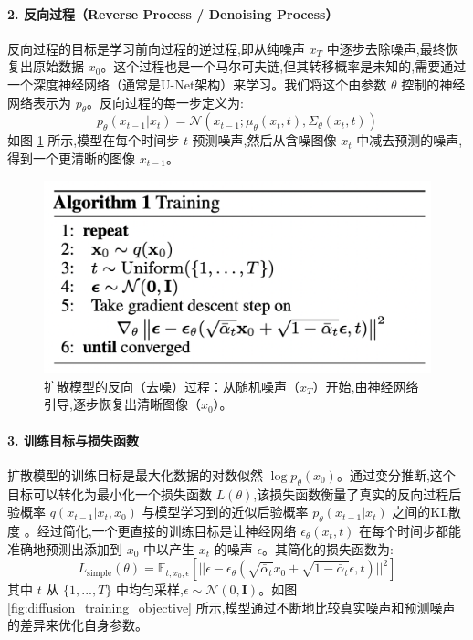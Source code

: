 \begin{itemize}
    \paragraph{2. 反向过程（Reverse Process / Denoising Process）}
    反向过程的目标是学习前向过程的逆过程,即从纯噪声 $x_T$ 中逐步去除噪声,最终恢复出原始数据 $x_0$。这个过程也是一个马尔可夫链,但其转移概率是未知的,需要通过一个深度神经网络（通常是U-Net架构）来学习。我们将这个由参数 $\theta$ 控制的神经网络表示为 $p_\theta$。反向过程的每一步定义为:
    $$ p_\theta(x_{t-1} | x_t) = \mathcal{N}(x_{t-1}; \mu_\theta(x_t, t), \Sigma_\theta(x_t, t)) $$
    如图 \ref{fig:diffusion_reverse_process} 所示,模型在每个时间步 $t$ 预测噪声,然后从含噪图像 $x_t$ 中减去预测的噪声,得到一个更清晰的图像 $x_{t-1}$。
    
    \begin{figure}[H]
        \centering
        \includegraphics[width=\textwidth]{figures/D2.png}
        \caption{扩散模型的反向（去噪）过程：从随机噪声（$x_T$）开始,由神经网络引导,逐步恢复出清晰图像（$x_0$）。}
        \label{fig:diffusion_reverse_process}
    \end{figure}

    \paragraph{3. 训练目标与损失函数}
    扩散模型的训练目标是最大化数据的对数似然 $\log p_\theta(x_0)$。通过变分推断,这个目标可以转化为最小化一个损失函数 $L(\theta)$,该损失函数衡量了真实的反向过程后验概率 $q(x_{t-1} | x_t, x_0)$ 与模型学习到的近似后验概率 $p_\theta(x_{t-1} | x_t)$ 之间的KL散度 \cite{315}。经过简化,一个更直接的训练目标是让神经网络 $\epsilon_\theta(x_t, t)$ 在每个时间步都能准确地预测出添加到 $x_0$ 中以产生 $x_t$ 的噪声 $\epsilon$。其简化的损失函数为:
    $$ L_{\text{simple}}(\theta) = \mathbb{E}_{t, x_0, \epsilon} \left[ || \epsilon - \epsilon_\theta(\sqrt{\bar{\alpha}_t}x_0 + \sqrt{1 - \bar{\alpha}_t}\epsilon, t) ||^2 \right] $$
    其中 $t$ 从 $\{1, ..., T\}$ 中均匀采样,$\epsilon \sim \mathcal{N}(0, \mathbf{I})$。如图 \ref{fig:diffusion_training_objective} 所示,模型通过不断地比较真实噪声和预测噪声的差异来优化自身参数。
    

\end{itemize}
